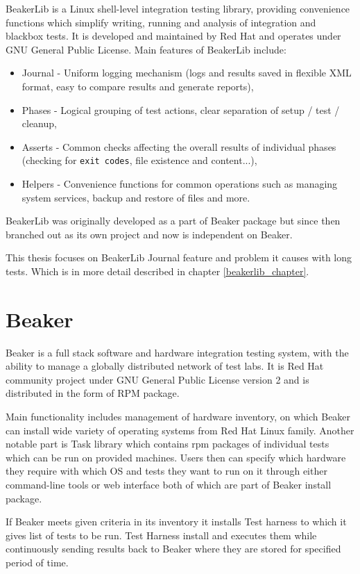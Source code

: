 BeakerLib is a Linux shell-level integration testing library, providing convenience functions which simplify writing, running and analysis of integration and blackbox tests\cite{beakerlib_wiki}.
It is developed and maintained by Red Hat and operates under GNU General Public License.
Main features of BeakerLib include:
\begin{itemize}
\item Journal - Uniform logging mechanism (logs and results saved in flexible XML format, easy to compare results and generate reports),
\item Phases - Logical grouping of test actions, clear separation of setup / test / cleanup,
\item Asserts - Common checks affecting the overall results of individual phases (checking for \texttt{exit codes}, file existence and content...),
\item Helpers - Convenience functions for common operations such as managing system services, backup and restore of files and more.
\end{itemize}

BeakerLib was originally developed as a part of Beaker package but since then branched out as its own project and now is independent on Beaker.

This thesis focuses on BeakerLib Journal feature and problem it causes with long tests. Which is in more detail described in chapter \ref{beakerlib_chapter}.

\section{Beaker}

Beaker is a full stack software and hardware integration testing system, with the ability to manage a globally distributed network of test labs\cite{beaker_doc}.  It is Red Hat community project under GNU General Public License version 2 and is distributed in the form of RPM package.

Main functionality includes management of hardware inventory, on which Beaker can install wide variety  of operating systems from Red Hat Linux family. Another notable part is Task library which contains rpm packages of individual tests which can be run on provided machines. 
Users then can specify which hardware they require with which OS and tests they want to run on it through either command-line tools or web interface both of which are part of Beaker install package. 

If Beaker meets given criteria in its inventory it installs Test harness to which it gives list of tests to be run.  Test Harness install and executes them while continuously sending results back to Beaker where they are stored for specified period of time. 

